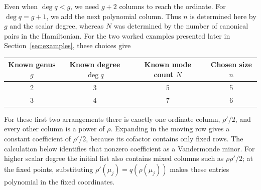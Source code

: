 \documentclass[11pt]{article}
\begin{document}
Even when $\deg q<g$, we need $g+2$ columns to reach the ordinate. For $\deg q=g+1$, we add the next polynomial column. Thus $n$ is determined here by $g$ and the scalar degree, whereas $N$ was determined by the number of canonical pairs in the Hamiltonian. For the two worked examples presented later in Section~\ref{sec:examples}, these choices give
\begin{center}
\begin{tabular}{cccc}\toprule
Known genus $g$ & Known degree $\deg q$ & Known mode count $N$ & Chosen size $n$\\\midrule
2 & 3 & 5 & 5\\
3 & 4 & 7 & 6\\
\bottomrule\end{tabular}
\end{center}

For these first two arrangements there is exactly one ordinate column, $\rho'/2$, and every other column is a power of $\rho$. Expanding in the moving row gives a constant coefficient of $\rho'/2$, because its cofactor contains only fixed rows. The calculation below identifies that nonzero coefficient as a Vandermonde minor. For higher scalar degree the initial list also contains mixed columns such as $\rho\rho'/2$; at the fixed points, substituting $\rho'(\mu_j)=q(\rho(\mu_j))$ makes these entries polynomial in the fixed coordinates.
\end{document}
